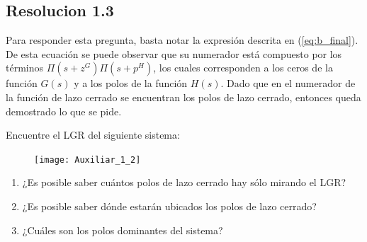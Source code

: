 \documentclass[
  11pt,
  letterpaper,
   addpoints,
   answers
  ]{exam}
\begin{document}
\begin{questions}
\begin{solution}
\subsection*{Resolucion 1.3}
Para responder esta pregunta, basta notar la expresión descrita en (\ref{eq:b_final}). De esta ecuación se puede observar que su numerador está compuesto por los términos $\Pi (s+z^{G}) \Pi (s+p^{H})$, los cuales corresponden a los ceros de la función $G(s)$ y a los polos de la función $H(s)$. Dado que en el numerador de la función de lazo cerrado se encuentran los polos de lazo cerrado, entonces queda demostrado lo que se pide.
    \end{solution}
    \question Encuentre el LGR del siguiente sistema:
    \begin{figure}[h!]
        \centering
        \texttt{[image: Auxiliar\_1\_2]}
    \end{figure}
    \begin{enumerate}
        \item ¿Es posible saber cuántos polos de lazo cerrado hay sólo mirando el LGR?
        \item ¿Es posible saber dónde estarán ubicados los polos de lazo cerrado?
        \item ¿Cuáles son los polos dominantes del sistema?
    \end{enumerate}
\begin{solution}

\end{solution}
\end{questions}
\end{document}
